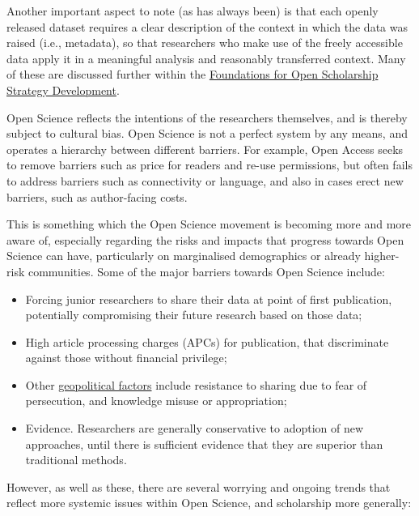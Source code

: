 \documentclass[]{book}
\begin{document}
{{{{Another important aspect to note (as has always been) is that each openly released dataset requires a clear description of the context in which the data was raised (i.e., metadata), so that researchers who make use of the freely accessible data apply it in a meaningful analysis and reasonably transferred context. Many of these are discussed further within the \href{https://open-scholarship-strategy.github.io/site/\#Challenges}{Foundations for Open Scholarship Strategy Development}.

Open Science reflects the intentions of the researchers themselves, and is thereby subject to cultural bias. Open Science is not a perfect system by any means, and operates a hierarchy between different barriers. For example, Open Access seeks to remove barriers such as price for readers and re-use permissions, but often fails to address barriers such as connectivity or language, and also in cases erect new barriers, such as author-facing costs.

This is something which the Open Science movement is becoming more and more aware of, especially regarding the risks and impacts that progress towards Open Science can have, particularly on marginalised demographics or already higher-risk communities. Some of the major barriers towards Open Science include:

\begin{itemize}
\item
  Forcing junior researchers to share their data at point of first publication, potentially compromising their future research based on those data;
\item
  High article processing charges (APCs) for publication, that discriminate against those without financial privilege;
\item
  Other \href{https://medium.com/@denalbz/power-and-inequality-in-open-science-discourses-9d425b0c2b63}{geopolitical factors} include resistance to sharing due to fear of persecution, and knowledge misuse or appropriation;
\item
  Evidence. Researchers are generally conservative to adoption of new approaches, until there is sufficient evidence that they are superior than traditional methods.
\end{itemize}

However, as well as these, there are several worrying and ongoing trends that reflect more systemic issues within Open Science, and scholarship more generally:

}}}}
\end{document}
